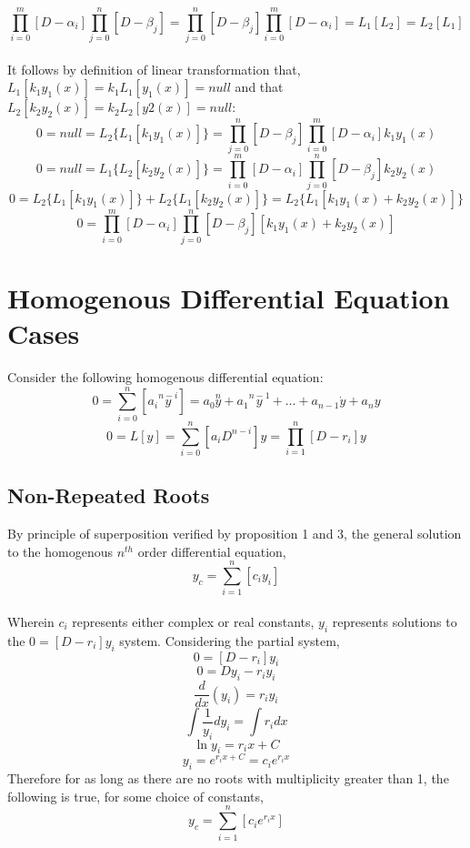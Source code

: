 $$\prod_{i = 0}^{m}\left[D - \alpha_{i}\right]\prod_{j = 0}^{n}\left[D - \beta_{j}\right] = \prod_{j = 0}^{n}\left[D - \beta_{j}\right]\prod_{i = 0}^{m}\left[D - \alpha_{i}\right] = L_1[L_2] = L_2[L_1]$$
\\It follows by definition of linear transformation that, $L_1[k_1y_1(x)] = k_1L_1[y_1(x)] = null$ and that $L_2[k_2y_2(x)] = k_2L_2[y2(x)] = null$:
$$0 =null = L_2\{L_1[k_1y_1(x)]\}=\prod_{j = 0}^{n}\left[D - \beta_{j}\right]\prod_{i = 0}^{m}\left[D - \alpha_{i}\right]k_1y_1(x)$$
$$0 = null = L_1\{L_2[k_2y_2(x)]\} = \prod_{i = 0}^{m}\left[D - \alpha_{i}\right]\prod_{j = 0}^{n}\left[D - \beta_{j}\right]k_2y_2(x)$$
$$0 = L_2\{L_1[k_1y_1(x)]\} + L_2\{L_1[k_2y_2(x)]\} = L_2\{L_1[k_1y_1(x) + k_2y_2(x)]\}$$
$$0  = \prod_{i = 0}^{m}\left[D - \alpha_{i}\right]\prod_{j = 0}^{n}\left[D - \beta_{j}\right][k_1y_1(x) + k_2y_2(x)]$$
\section{Homogenous Differential Equation Cases}
\begin{comment}
\end{comment}
Consider the following homogenous differential equation:
$$0 = \sum_{i = 0}^{n}\left[a_i\overset{n-i}{y}\right] = a_0 \overset{n}{y} + a_1 \overset{n - 1}{y} + \dots + a_{n-1} \dot{y} + a_n y$$
$$0 = L[y] = \sum_{i = 0}^{n}\left[a_i D^{n - i}\right]y = \prod_{i = 1}^{n}\left[D - r_i\right]y$$
\subsection{Non-Repeated Roots}
\begin{comment}
\end{comment}
By principle of superposition verified by proposition 1 and 3, the general solution to the homogenous $n^{th}$ order differential equation,
$$y_c = \sum_{i = 1}^{n}\left[c_i y_i\right]$$
\\Wherein $c_i$ represents either complex or real constants, $y_i$ represents solutions to the $0 = [D - r_i]y_i$ system. Considering the partial system,
$$0 = [D - r_i]y_i$$
$$0 = Dy_i - r_i y_i$$
$$\frac{d}{dx}(y_i) = r_i y_i $$
$$\int \frac{1}{y_i}dy_i = \int r_i dx $$
$$\ln{y_i} = r_i x + C$$
$$y_i = e^{r_i x + C} = c_i e^{r_i x}$$
Therefore for as long as there are no roots with multiplicity greater than 1, the following is true, for some choice of constants,
$$y_c = \sum_{i = 1}^{n}\left[c_i e^{r_i x}\right]$$
